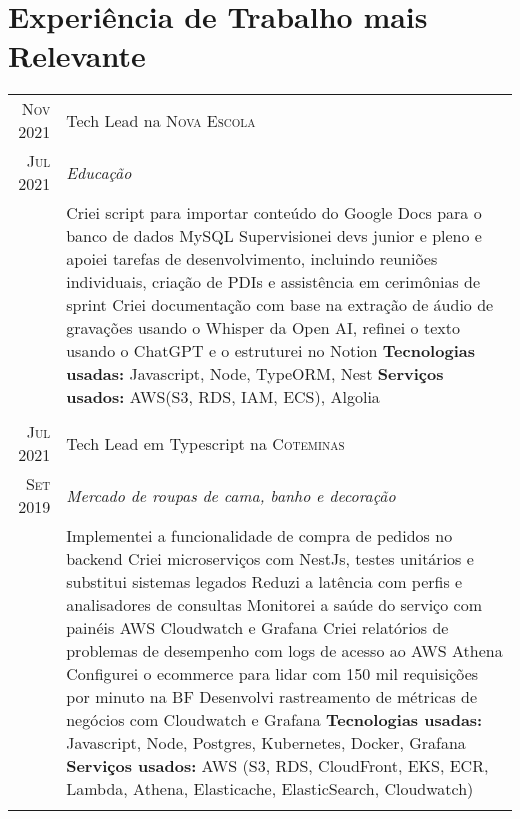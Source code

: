 \documentclass[a4paper,10pt]{article}
\begin{document}
\section{Experiência de Trabalho mais Relevante}
\begin{tabular}{r|p{11cm}}

\textsc{Nov 2021} & Tech Lead na \textsc{Nova Escola} \\\textsc{Jul 2021}&\emph{Educação }\\&\footnotesize{ 
 Criei script para importar conteúdo do Google Docs para o banco de dados MySQL \newline
 Supervisionei devs junior e pleno e apoiei tarefas de desenvolvimento, incluindo reuniões individuais, criação de PDIs e assistência em cerimônias de sprint \newline
 Criei documentação com base na extração de áudio de gravações usando o Whisper da Open AI, refinei o texto usando o ChatGPT e o estruturei no Notion \newline
 \textbf{Tecnologias usadas:} Javascript, Node, TypeORM, Nest \newline
\textbf{Serviços usados:} AWS(S3, RDS, IAM, ECS), Algolia}\\\multicolumn{2}{c}{} \\

\textsc{Jul 2021} & Tech Lead em Typescript na \textsc{Coteminas} \\\textsc{Set 2019}&\emph{Mercado de roupas de cama, banho e decoração }\\&\footnotesize{ 
 Implementei a funcionalidade de compra de pedidos no backend \newline
 Criei microserviços com NestJs, testes unitários e substitui sistemas legados \newline
 Reduzi a latência com perfis e analisadores de consultas \newline
 Monitorei a saúde do serviço com painéis AWS Cloudwatch e Grafana \newline
 Criei relatórios de problemas de desempenho com logs de acesso ao AWS Athena \newline
 Configurei o ecommerce para lidar com 150 mil requisições por minuto na BF \newline
 Desenvolvi rastreamento de métricas de negócios com Cloudwatch e Grafana \newline 
\textbf{Tecnologias usadas:} Javascript, Node, Postgres, Kubernetes, Docker, Grafana \newline
\textbf{Serviços usados:} AWS (S3, RDS, CloudFront, EKS, ECR, Lambda, Athena, Elasticache, ElasticSearch, Cloudwatch)}\\\multicolumn{2}{c}{} \\



\end{tabular}
\end{document}
